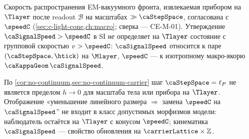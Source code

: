 \begin{proposition}
\label{prop:t-speed-limit}
Скорость распространения EM-вакуумного фронта, извлекаемая прибором на $\Tlayer$
после readout $\mathcal{B}$ на масштабах $\gg\caStepSpace$,
согласована с $\speedC$ (\cref{sec:c-light-cone,ch:macro}; сверка --- CE-M-01).
Утверждение $\caSignalSpeed>\speedC$ в SI \emph{не} определяет на $\Tlayer$
состояние с групповой скоростью $v>\speedC$:
$\caSignalSpeed$ относится к паре $(\caStepSpace,\htick)$ на $\Mlayer$,
$\speedC$ --- к изотропному макро-якорю $\caKappaGeom\,\caSignalSpeed$.
\end{proposition}

\begin{corollary}
\label{cor:no-m-kinematic-access}
По \cref{cor:no-continuum,sec:no-continuum-carrier} шаг $\caStepSpace=\ell_P$ не является
пределом $h\to 0$ для масштаба тела или прибора на $\Tlayer$.
Отображение «уменьшение линейного размера $\Rightarrow$ замена $\speedC$ на $\caSignalSpeed$''
не входит в класс допустимых морфизмов модели: наблюдатель остаётся на $\Tlayer$
с конусом $\speedC$; кинематика $\caSignalSpeed$ --- свойство обновления на $\carrierLattice\times\mathbb{Z}$.
\end{corollary}

